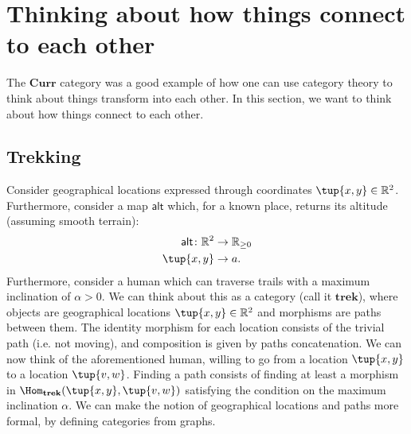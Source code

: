 \section{Thinking about how things connect to each other}
The $\mathbf{Curr}$ category was a good example of how one can use category theory to think about things transform into each other. In this section, we want to think about how things connect to each other.
\subsection{Trekking}
Consider geographical locations expressed through coordinates $\tup{x,y}\in \mathbb{R}^2$. Furthermore, consider a map $\mathsf{alt}$ which, for a known place, returns its altitude (assuming smooth terrain):
\begin{equation}
    \begin{aligned}
    \mathsf{alt}\colon \mathbb{R}^2&\to \mathbb{R}_{\geq 0}\\
    \tup{x,y}&\to a.
    \end{aligned}
\end{equation}
Furthermore, consider a human which can traverse trails with a maximum inclination of $\alpha>0$. We can think about this as a category (call it $\mathbf{trek}$), where objects are geographical locations $\tup{x,y}\in \mathbb{R}^2$ and morphisms are paths between them. The identity morphism for each location consists of the trivial path (i.e. not moving), and composition is given by paths concatenation. We can now think of the aforementioned human, willing to go from a location $\tup{x,y}$ to a location $\tup{v,w}$. Finding a path consists of finding at least a morphism in $\Hom_\mathbf{trek}(\tup{x,y},\tup{v,w})$ satisfying the condition on the maximum inclination $\alpha$. We can make the notion of geographical locations and paths more formal, by defining categories from graphs.


